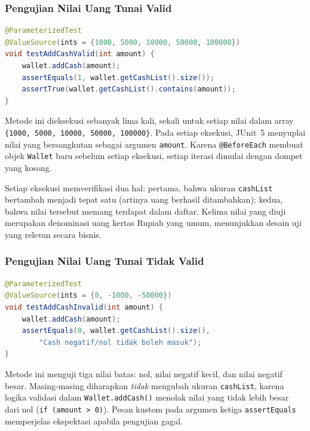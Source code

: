 \documentclass[12pt,a4paper]{article}
\begin{document}
\subsubsection{Pengujian Nilai Uang Tunai Valid}

\begin{lstlisting}[language=Java, caption={Pengujian \texttt{addCash} dengan nilai valid menggunakan \texttt{@ValueSource}}]
@ParameterizedTest
@ValueSource(ints = {1000, 5000, 10000, 50000, 100000})
void testAddCashValid(int amount) {
    wallet.addCash(amount);
    assertEquals(1, wallet.getCashList().size());
    assertTrue(wallet.getCashList().contains(amount));
}
\end{lstlisting}

Metode ini dieksekusi sebanyak lima kali, sekali untuk setiap nilai dalam array
\texttt{\{1000, 5000, 10000, 50000, 100000\}}.  Pada setiap eksekusi, JUnit~5 menyuplai
nilai yang bersangkutan sebagai argumen \texttt{amount}.  Karena \texttt{@BeforeEach}
membuat objek \texttt{Wallet} baru sebelum setiap eksekusi, setiap iterasi dimulai
dengan dompet yang kosong.

Setiap eksekusi memverifikasi dua hal: pertama, bahwa ukuran \texttt{cashList} bertambah
menjadi tepat satu (artinya uang berhasil ditambahkan); kedua, bahwa nilai tersebut
memang terdapat dalam daftar.  Kelima nilai yang diuji merupakan denominasi uang kertas
Rupiah yang umum, menunjukkan desain uji yang relevan secara bisnis.

\subsubsection{Pengujian Nilai Uang Tunai Tidak Valid}

\begin{lstlisting}[language=Java, caption={Pengujian \texttt{addCash} dengan nilai tidak valid menggunakan \texttt{@ValueSource}}]
@ParameterizedTest
@ValueSource(ints = {0, -1000, -50000})
void testAddCashInvalid(int amount) {
    wallet.addCash(amount);
    assertEquals(0, wallet.getCashList().size(),
        "Cash negatif/nol tidak boleh masuk");
}
\end{lstlisting}

Metode ini menguji tiga nilai batas: nol, nilai negatif kecil, dan nilai negatif besar.
Masing-masing diharapkan \emph{tidak} mengubah ukuran \texttt{cashList}, karena logika
validasi dalam \texttt{Wallet.addCash()} menolak nilai yang tidak lebih besar dari nol
(\texttt{if (amount > 0)}).  Pesan kustom pada argumen ketiga \texttt{assertEquals}
memperjelas ekspektasi apabila pengujian gagal.
\end{document}
